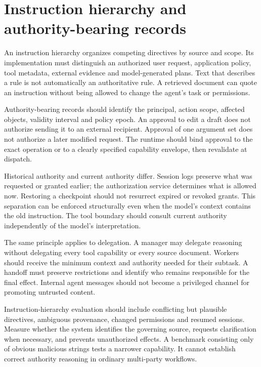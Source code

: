 \section{Instruction hierarchy and authority-bearing records}\label{sec:C29:hierarchy}
An instruction hierarchy organizes competing directives by source and scope. Its implementation must distinguish an authorized user request, application policy, tool metadata, external evidence and model-generated plans. Text that describes a rule is not automatically an authoritative rule. A retrieved document can quote an instruction without being allowed to change the agent's task or permissions.

Authority-bearing records should identify the principal, action scope, affected objects, validity interval and policy epoch. An approval to edit a draft does not authorize sending it to an external recipient. Approval of one argument set does not authorize a later modified request. The runtime should bind approval to the exact operation or to a clearly specified capability envelope, then revalidate at dispatch.

Historical authority and current authority differ. Session logs preserve what was requested or granted earlier; the authorization service determines what is allowed now. Restoring a checkpoint should not resurrect expired or revoked grants. This separation can be enforced structurally even when the model's context contains the old instruction. The tool boundary should consult current authority independently of the model's interpretation.

The same principle applies to delegation. A manager may delegate reasoning without delegating every tool capability or every source document. Workers should receive the minimum context and authority needed for their subtask. A handoff must preserve restrictions and identify who remains responsible for the final effect. Internal agent messages should not become a privileged channel for promoting untrusted content.

Instruction-hierarchy evaluation should include conflicting but plausible directives, ambiguous provenance, changed permissions and resumed sessions. Measure whether the system identifies the governing source, requests clarification when necessary, and prevents unauthorized effects. A benchmark consisting only of obvious malicious strings tests a narrower capability. It cannot establish correct authority reasoning in ordinary multi-party workflows.

